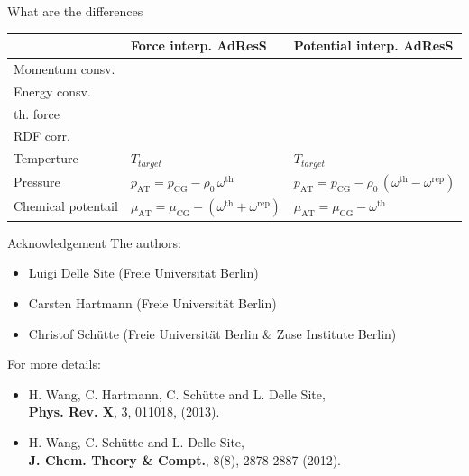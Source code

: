 \documentclass[]{beamer}
\newcommand{\redc}[1]{{\color{red} #1}}
\newcommand{\bluec}[1]{{\color{blue} #1}}
\newcommand{\AT}{{\textrm{{AT}}}}
\newcommand{\CG}{{\textrm{CG}}}
\newcommand{\thf}{{\textrm{th}}}
\newcommand{\rep}{{\textrm{rep}}}
\newcommand{\tickYes}{\checkmark}
\newcommand{\tickNo}{\hspace{1pt}\ding{55}}
\begin{document}
\begin{frame}{What are the differences}
  \small{
  \begin{table}
    \centering
    \begin{tabular*}{0.95\textwidth}{@{\extracolsep{\fill}}lll}
      &         Force interp. AdResS     &       Potential interp. AdResS \\\hline
      Momentum consv.     &       \bluec{\tickYes}        &       \redc{\tickNo}\\      
      \rowcolor{MyGray}
      Energy consv. &     \redc{\tickNo}  &       \bluec{\tickYes}\\
      th. force &  \bluec{\tickYes} &  \bluec{\tickYes}\\
      \rowcolor{MyGray}
      RDF corr. &  \bluec{\tickYes} &  \redc{\tickNo}\\
      Temperture          &     \bluec{$T_{target}$}      & \bluec{$T_{target}$}\\
      \rowcolor{MyGray}
      Pressure          &   \bluec{$p_\AT = p_\CG - \rho_0\, \omega^\thf$} &
      \bluec{$p_\AT = p_\CG - \rho_0\, (\omega^\thf - \omega^\rep)$}\\
      Chemical potentail          &   \bluec{$\mu_\AT = \mu_\CG - (\omega^\thf +\omega^\rep)$} &
      \bluec{$\mu_\AT = \mu_\CG - \omega^\thf$}
    \end{tabular*}
  \end{table}
  }
\end{frame}


\begin{frame}{Acknowledgement}
  \vfill
  The authors:
  \begin{itemize}
  \item Luigi Delle Site (Freie Universit\"at Berlin)
  \item Carsten Hartmann (Freie Universit\"at Berlin)
  \item Christof Sch\"utte (Freie Universit\"at Berlin \& Zuse Institute Berlin)
  \end{itemize}
  \vfill
  For more details:
  \begin{itemize}
  \item H. Wang, C. Hartmann, C. Sch\"utte and L. Delle Site,\\
    \textbf{Phys. Rev. X}, 3, 011018, (2013).
  \item H. Wang, C. Sch\"utte and L. Delle Site,\\
    \textbf{J. Chem. Theory \& Compt.}, 8(8), 2878-2887 (2012).
  \end{itemize}
  \vfill
\end{frame}
\end{document}
